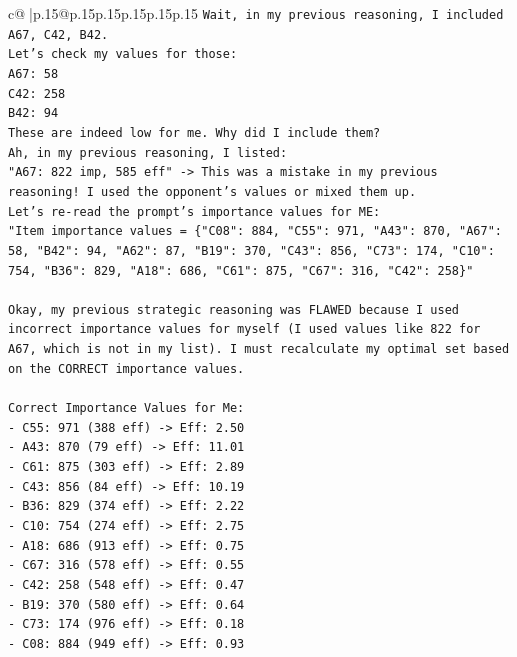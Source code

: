 \documentclass{article}
\begin{document}
{\begin{supertabular}{c@{$\;$}|p{.15\linewidth}@{}p{.15\linewidth}p{.15\linewidth}p{.15\linewidth}p{.15\linewidth}p{.15\linewidth}}
{{{\texttt{Wait, in my previous reasoning, I included A67, C42, B42.} \\
\texttt{Let's check my values for those:} \\
\texttt{A67: 58} \\
\texttt{C42: 258} \\
\texttt{B42: 94} \\
\texttt{These are indeed low for me. Why did I include them?} \\
\texttt{Ah, in my previous reasoning, I listed:} \\
\texttt{"A67: 822 imp, 585 eff" {-}> This was a mistake in my previous reasoning! I used the opponent's values or mixed them up.} \\
\texttt{Let's re{-}read the prompt's importance values for ME:} \\
\texttt{"Item importance values = \{"C08": 884, "C55": 971, "A43": 870, "A67": 58, "B42": 94, "A62": 87, "B19": 370, "C43": 856, "C73": 174, "C10": 754, "B36": 829, "A18": 686, "C61": 875, "C67": 316, "C42": 258\}"} \\
\\ 
\texttt{Okay, my previous strategic reasoning was FLAWED because I used incorrect importance values for myself (I used values like 822 for A67, which is not in my list). I must recalculate my optimal set based on the CORRECT importance values.} \\
\\ 
\texttt{Correct Importance Values for Me:} \\
\texttt{{-} C55: 971 (388 eff) {-}> Eff: 2.50} \\
\texttt{{-} A43: 870 (79 eff) {-}> Eff: 11.01} \\
\texttt{{-} C61: 875 (303 eff) {-}> Eff: 2.89} \\
\texttt{{-} C43: 856 (84 eff) {-}> Eff: 10.19} \\
\texttt{{-} B36: 829 (374 eff) {-}> Eff: 2.22} \\
\texttt{{-} C10: 754 (274 eff) {-}> Eff: 2.75} \\
\texttt{{-} A18: 686 (913 eff) {-}> Eff: 0.75} \\
\texttt{{-} C67: 316 (578 eff) {-}> Eff: 0.55} \\
\texttt{{-} C42: 258 (548 eff) {-}> Eff: 0.47} \\
\texttt{{-} B19: 370 (580 eff) {-}> Eff: 0.64} \\
\texttt{{-} C73: 174 (976 eff) {-}> Eff: 0.18} \\
\texttt{{-} C08: 884 (949 eff) {-}> Eff: 0.93} \\
}}}
\end{supertabular}}
\end{document}
